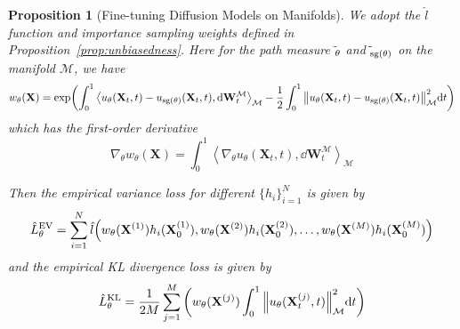 \documentclass{article}
\theoremstyle{plain}
\newtheorem{proposition}[theorem]{Proposition}
\theoremstyle{definition}
\theoremstyle{remark}
\let\P\relax
\DeclareMathOperator{\P}{\mathbb{P}}
\DeclareMathOperator{\sg}{\mathrm{sg}}
\newcommand{\inner}[2]{\left\langle #1, #2\right\rangle}
\begin{document}
\begin{proposition}[Fine-tuning Diffusion Models on Manifolds]\label{prop:diffusion_model_finetune}
    We adopt the $\hat{l}$ function and importance sampling weights defined in Proposition~\ref{prop:unbiasedness}. Here for the path measure $\tilde{\P}_\theta$ and $\tilde{\P}_{\sg(\theta)}$ on the manifold $\mathcal{M}$, we have
    \begin{equation}
        w_\theta(\mathbf{X}) = \exp(\int_0^1 \inner{u_\theta(\mathbf{X}_t, t)-u_{\sg(\theta)}(\mathbf{X}_t, t)}{\dd \mathbf{W}_t^\mathcal{M}}_\mathcal{M} -\frac{1}{2}\int_0^1 \norm{u_\theta(\mathbf{X}_t, t)-u_{\sg(\theta)}(\mathbf{X}_t, t)}^2_\mathcal{M} \dd t)
    \end{equation}
    which has the first-order derivative
    \begin{equation}
        \nabla_\theta w_\theta(\mathbf{X}) = \int_0^1 \inner{\nabla_\theta u_\theta(\mathbf{X}_t, t)}{\dd \mathbf{W}_t^\mathcal{M}}_\mathcal{M}
    \end{equation}
    
    Then the empirical variance loss for different $\{h_i\}_{i=1}^N$ is given by
    \begin{equation}
        \hat{L}_\theta^\text{EV} = \sum_{i=1}^{N}\hat{l}\qty(w_\theta(\mathbf{X}^{(1)})h_i(\mathbf{X}_0^{(1)}), w_\theta(\mathbf{X}^{(2)})h_i(\mathbf{X}_0^{(2)}), \dots, w_\theta(\mathbf{X}^{(M)})h_i(\mathbf{X}_0^{(M)}))
    \end{equation}
    and the empirical KL divergence loss is given by
    \begin{equation}
        \hat{L}_\theta^\text{KL} = \frac{1}{2M} \sum_{j=1}^M \qty(w_\theta(\mathbf{X}^{(j)}) \int_0^1 \norm{u_\theta(\mathbf{X}_t^{(j)}, t)}_\mathcal{M}^2 \dd t)
    \end{equation}
\end{proposition}

\end{document}

